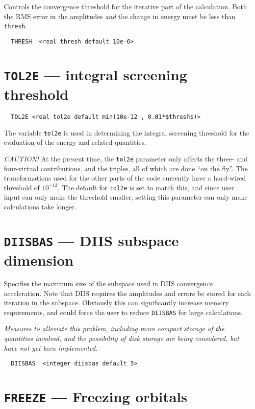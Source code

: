 Controls the convergence threshold for the iterative part of the
calculation.  Both the RMS error in the amplitudes {\em and} the
change in energy must be less than {\tt thresh}.

\begin{verbatim}
  THRESH  <real thresh default 10e-6>
\end{verbatim}

\section{{\tt TOL2E} --- integral screening threshold}

\begin{verbatim}
  TOL2E <real tol2e default min(10e-12 , 0.01*$thresh$)>
\end{verbatim}

The variable \verb+tol2e+ is used in determining the integral
screening threshold for the evaluation of the energy and related
quantities.

{\em CAUTION!}  At the present time, the \verb+tol2e+ parameter only
affects the three- and four-virtual contributions, and the triples,
all of which are done ``on the fly''. The transformations
used for the other parts of the code currently have a hard-wired
threshold of $10^{-12}$.  The default for \verb+tol2e+ is set to match
this, and since user input can only make the threshold smaller,
setting this parameter can only make calculations take longer.

\section{{\tt DIISBAS} --- DIIS subspace dimension}

Specifies the maximum size of the subspace used in DIIS convergence
acceleration.  Note that DIIS requires the amplitudes and errors be
stored for each iteration in the subspace.  Obviously this can
significantly increase memory requirements, and could force the user
to reduce \verb+DIISBAS+ for large calculations.

{\em Measures to alleviate this problem, including more compact
storage of the quantities involved, and the possibility of disk
storage are being considered, but have not yet been implemented.}

\begin{verbatim}
  DIISBAS  <integer diisbas default 5>
\end{verbatim}

\section{{\tt FREEZE} --- Freezing orbitals}

